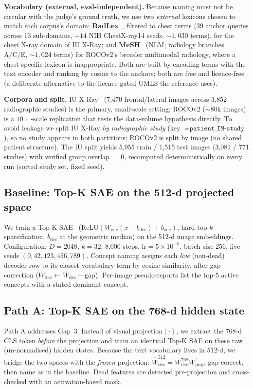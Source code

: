 \documentclass[sigconf, nonacm]{acmart}
\begin{document}
\textbf{Vocabulary (external, eval-independent).} Because naming must not be circular with the judge's ground truth, we use two \emph{external} lexicons chosen to match each corpus's domain: \textbf{RadLex}~\cite{langlotz2006radlex}, filtered to chest terms (39 anchor queries across 13 sub-domains, $+14$ NIH ChestX-ray14 seeds, ${\sim}1{,}030$ terms), for the chest X-ray domain of IU X-Ray; and \textbf{MeSH}~\cite{nlm2026mesh} (NLM; radiology branches A/C/E, ${\sim}1{,}024$ terms) for ROCOv2's broader multimodal radiology, where a chest-specific lexicon is inappropriate. Both are built by encoding terms with the text encoder and ranking by cosine to the anchors; both are free and licence-free (a deliberate alternative to the licence-gated UMLS the reference uses).

\textbf{Corpora and split.} IU X-Ray~\cite{demner2016iuxray} (7,470 frontal/lateral images across 3,852 radiographic studies) is the primary, small-scale setting; ROCOv2 (${\sim}80$k images) is a $10{\times}$-scale replication that tests the data-volume hypothesis directly. To avoid leakage we split IU X-Ray \emph{by radiographic study} (key $=\texttt{patient\_IM-study}$), so no study appears in both partitions; ROCOv2 is split by image (no shared patient structure). The IU split yields 5,955 train / 1,515 test images (3,081 / 771 studies) with verified group overlap $=0$, recomputed deterministically on every run (sorted study set, fixed seed).

\subsection{Baseline: Top-K SAE on the 512-d projected space}
We train a Top-K SAE~\cite{gao2024scaling} ($\mathrm{ReLU}(W_{\mathrm{enc}}(x-b_{\mathrm{dec}})+b_{\mathrm{enc}})$, hard top-$k$ sparsification, $b_{\mathrm{dec}}$ at the geometric median) on the 512-d image embeddings. Configuration: $D{=}2048$, $k{=}32$, 8,000 steps, $\mathrm{lr}{=}5{\times}10^{-5}$, batch size 256, five seeds $(0,42,123,456,789)$. Concept naming assigns each \emph{live} (non-dead) decoder row to its closest vocabulary term by cosine similarity, after gap correction ($W_{\mathrm{dec}}\!\leftarrow\!W_{\mathrm{dec}}-\mathrm{gap}$). Per-image pseudo-reports list the top-5 active concepts with a stated dominant concept.

\subsection{Path A: Top-K SAE on the 768-d hidden state}
Path A addresses Gap~3. Instead of $\mathrm{visual\_projection}(\cdot)$, we extract the 768-d CLS token \emph{before} the projection and train an identical Top-K SAE on these raw (un-normalised) hidden states. Because the text vocabulary lives in 512-d, we bridge the two spaces with the \emph{frozen} projection: $\hat W_{\mathrm{dec}}^{512}=W_{\mathrm{dec}}^{768}W_{\mathrm{proj}}^{\top}$, gap-correct, then name as in the baseline. Dead features are detected pre-projection and cross-checked with an activation-based mask.
\end{document}
